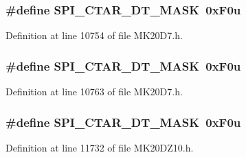 \subsubsection[{\texorpdfstring{S\+P\+I\+\_\+\+C\+T\+A\+R\+\_\+\+D\+T\+\_\+\+M\+A\+SK}{SPI_CTAR_DT_MASK}}]{\setlength{\rightskip}{0pt plus 5cm}\#define S\+P\+I\+\_\+\+C\+T\+A\+R\+\_\+\+D\+T\+\_\+\+M\+A\+SK~0x\+F0u}\hypertarget{group___s_p_i___register___masks_ga7d4ee19c78f67b68c6320eefe6a53ac0}{}\label{group___s_p_i___register___masks_ga7d4ee19c78f67b68c6320eefe6a53ac0}


Definition at line 10754 of file M\+K20\+D7.\+h.

\subsubsection[{\texorpdfstring{S\+P\+I\+\_\+\+C\+T\+A\+R\+\_\+\+D\+T\+\_\+\+M\+A\+SK}{SPI_CTAR_DT_MASK}}]{\setlength{\rightskip}{0pt plus 5cm}\#define S\+P\+I\+\_\+\+C\+T\+A\+R\+\_\+\+D\+T\+\_\+\+M\+A\+SK~0x\+F0u}\hypertarget{group___s_p_i___register___masks_ga7d4ee19c78f67b68c6320eefe6a53ac0}{}\label{group___s_p_i___register___masks_ga7d4ee19c78f67b68c6320eefe6a53ac0}


Definition at line 10763 of file M\+K20\+D7.\+h.

\subsubsection[{\texorpdfstring{S\+P\+I\+\_\+\+C\+T\+A\+R\+\_\+\+D\+T\+\_\+\+M\+A\+SK}{SPI_CTAR_DT_MASK}}]{\setlength{\rightskip}{0pt plus 5cm}\#define S\+P\+I\+\_\+\+C\+T\+A\+R\+\_\+\+D\+T\+\_\+\+M\+A\+SK~0x\+F0u}\hypertarget{group___s_p_i___register___masks_ga7d4ee19c78f67b68c6320eefe6a53ac0}{}\label{group___s_p_i___register___masks_ga7d4ee19c78f67b68c6320eefe6a53ac0}


Definition at line 11732 of file M\+K20\+D\+Z10.\+h.

